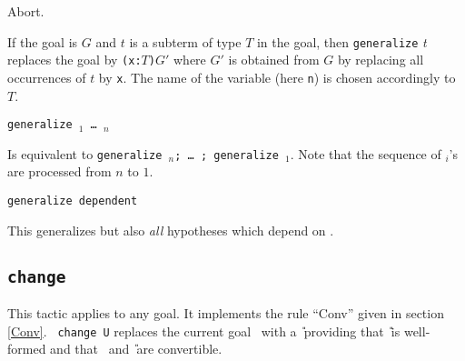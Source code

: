 \begin{coq_eval}
Abort.
\end{coq_eval}

If the goal is $G$ and $t$ is a subterm of type $T$ in the goal, then
{\tt generalize} \textit{t} replaces the goal by {\tt (x:$T$)$G'$}
where $G'$ is obtained from $G$ by replacing all occurrences of $t$ by
{\tt x}. The name of the variable (here {\tt n}) is chosen accordingly
to $T$.

\begin{Variants}
\item {\tt generalize \term$_1$ \dots\ \term$_n$} 
  
  Is equivalent to {\tt generalize \term$_n$; \dots\ ; generalize
    \term$_1$}. Note that the sequence of \term$_i$'s are processed
  from $n$ to $1$.
  
\item {\tt generalize dependent \term} 
  
  This generalizes {\term} but also {\em all} hypotheses which depend
  on {\term}.

\end{Variants}

\subsection{\tt change \term}
\label{change}

This tactic applies to any goal. It implements the rule
``Conv'' given in section \ref{Conv}.  {\tt
  change U} replaces the current goal \T\ with a \U\ providing that
\U\ is well-formed and that \T\ and \U\ are convertible.

\begin{ErrMsgs}
\item {}
\end{ErrMsgs}

